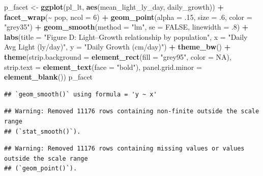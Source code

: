 \documentclass[
]{article}
\newenvironment{Shaded}{\begin{snugshade}}{\end{snugshade}}
\newcommand{\AttributeTok}[1]{\textcolor[rgb]{0.13,0.29,0.53}{#1}}
\newcommand{\ConstantTok}[1]{\textcolor[rgb]{0.56,0.35,0.01}{#1}}
\newcommand{\DecValTok}[1]{\textcolor[rgb]{0.00,0.00,0.81}{#1}}
\newcommand{\FunctionTok}[1]{\textcolor[rgb]{0.13,0.29,0.53}{\textbf{#1}}}
\newcommand{\NormalTok}[1]{#1}
\newcommand{\OtherTok}[1]{\textcolor[rgb]{0.56,0.35,0.01}{#1}}
\newcommand{\SpecialCharTok}[1]{\textcolor[rgb]{0.81,0.36,0.00}{\textbf{#1}}}
\newcommand{\StringTok}[1]{\textcolor[rgb]{0.31,0.60,0.02}{#1}}
\begin{document}
\begin{Shaded}
\begin{Highlighting}[]
\NormalTok{p\_facet }\OtherTok{\textless{}{-}} \FunctionTok{ggplot}\NormalTok{(pl\_lt,}
                  \FunctionTok{aes}\NormalTok{(mean\_light\_ly\_day, daily\_growth)) }\SpecialCharTok{+}
  \FunctionTok{facet\_wrap}\NormalTok{(}\SpecialCharTok{\textasciitilde{}}\NormalTok{ pop, }\AttributeTok{ncol =} \DecValTok{6}\NormalTok{) }\SpecialCharTok{+}
  \FunctionTok{geom\_point}\NormalTok{(}\AttributeTok{alpha =}\NormalTok{ .}\DecValTok{15}\NormalTok{, }\AttributeTok{size =}\NormalTok{ .}\DecValTok{6}\NormalTok{, }\AttributeTok{color =} \StringTok{"grey35"}\NormalTok{) }\SpecialCharTok{+}
  \FunctionTok{geom\_smooth}\NormalTok{(}\AttributeTok{method =} \StringTok{"lm"}\NormalTok{, }\AttributeTok{se =} \ConstantTok{FALSE}\NormalTok{, }\AttributeTok{linewidth =}\NormalTok{ .}\DecValTok{8}\NormalTok{) }\SpecialCharTok{+}
  \FunctionTok{labs}\NormalTok{(}\AttributeTok{title =} \StringTok{"Figure D: Light–Growth relationship by population"}\NormalTok{,}
       \AttributeTok{x =} \StringTok{"Daily Avg Light (ly/day)"}\NormalTok{,}
       \AttributeTok{y =} \StringTok{"Daily Growth (cm/day)"}\NormalTok{) }\SpecialCharTok{+}
  \FunctionTok{theme\_bw}\NormalTok{() }\SpecialCharTok{+}
  \FunctionTok{theme}\NormalTok{(}\AttributeTok{strip.background =} \FunctionTok{element\_rect}\NormalTok{(}\AttributeTok{fill =} \StringTok{"grey95"}\NormalTok{, }\AttributeTok{color =} \ConstantTok{NA}\NormalTok{),}
        \AttributeTok{strip.text =} \FunctionTok{element\_text}\NormalTok{(}\AttributeTok{face =} \StringTok{"bold"}\NormalTok{),}
        \AttributeTok{panel.grid.minor =} \FunctionTok{element\_blank}\NormalTok{())}
\NormalTok{p\_facet}
\end{Highlighting}
\end{Shaded}

\begin{verbatim}
## `geom_smooth()` using formula = 'y ~ x'
\end{verbatim}

\begin{verbatim}
## Warning: Removed 11176 rows containing non-finite outside the scale range
## (`stat_smooth()`).
\end{verbatim}

\begin{verbatim}
## Warning: Removed 11176 rows containing missing values or values outside the scale range
## (`geom_point()`).
\end{verbatim}
\end{document}
